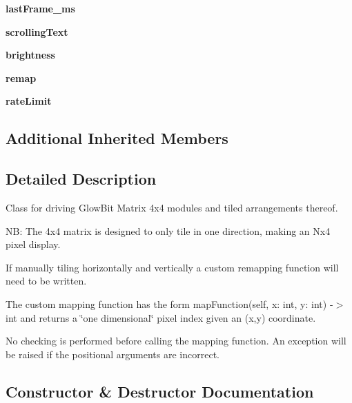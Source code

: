 \begin{DoxyCompactItemize}
{\bfseries last\+Frame\+\_\+ms}
\item 
\mbox{\label{classglowbit_1_1matrix4x4_a60001cda5a86c8d035838f528e3428dc}} 
{\bfseries scrolling\+Text}
\item 
\mbox{\label{classglowbit_1_1matrix4x4_aaa175c98bbdcb35a83dd59192ee0686f}} 
{\bfseries brightness}
\item 
\mbox{\label{classglowbit_1_1matrix4x4_a8d2971111428adb5e6ed35b6f07b63de}} 
{\bfseries remap}
\item 
\mbox{\label{classglowbit_1_1matrix4x4_acfc0f73dcf2d58bb48aec88b6fc0eb33}} 
{\bfseries rate\+Limit}
\end{DoxyCompactItemize}
\subsection*{Additional Inherited Members}


\subsection{Detailed Description}
Class for driving Glow\+Bit Matrix 4x4 modules and tiled arrangements thereof. 

NB\+: The 4x4 matrix is designed to only tile in one direction, making an Nx4 pixel display.

If manually tiling horizontally and vertically a custom remapping function will need to be written.

The custom mapping function has the form map\+Function(self, x\+: int, y\+: int) -\/$>$ int and returns a \char`\"{}one dimensional\char`\"{} pixel index given an (x,y) coordinate.

No checking is performed before calling the mapping function. An exception will be raised if the positional arguments are incorrect. 

\subsection{Constructor \& Destructor Documentation}
\mbox{\label{classglowbit_1_1matrix4x4_a9a9f870a9505b2a4e27519a8e279e81c}} 
